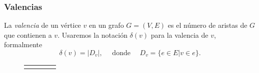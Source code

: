 \documentclass[handout]{beamer} %
\begin{document}
    \begin{frame}\frametitle{Valencias}
        La {\em {valencia}} de un vértice $v$ en un grafo $G=(V,E)$ es el
         número de aristas de $G$ que contienen a $v$.
        Usaremos la notación $\delta(v)$ para la valencia de $v$,
        formalmente
        $$
        \delta(v)=|D_v|, \quad \text{ donde } \quad D_v=\{e \in E| v\in
        e\}.
        $$
        
        \begin{ejemplo}
            \begin{figure}[ht]
                \begin{center}
                    \begin{tabular}{llll}
                        &\begin{tikzpicture}[scale=0.8]
                            \Vertex[x=0.00, y=2.00,L=$3$]{$a$}
                            \Vertex[x=1.90, y=0.62,L=$4$]{$b$}
                            \Vertex[x=1.18, y=-1.62,L=$1$]{$c$}
                            \Vertex[x=-1.18, y=-1.62,L=$3$]{$d$}
                            \Vertex[x=-1.90, y=0.62,L=$3$]{$e$}
                            \Edges($c$, $b$,$a$,$e$,$d$,$b$,$a$,$d$)
                            \Edges($e$,$b$)
                        \end{tikzpicture}
                        &
                        \qquad    \qquad
                        & 
                        \begin{tikzpicture}[scale=0.55]
                            \Vertex[x=3.00, y=0.00, L=$1$]{$v_3$}
                            \Vertex[x=1.50, y=2.60, L=$0$]{$v_2$}
                            \Vertex[x=-1.50, y=2.60, L=$2$]{$v_1$}
                            \Vertex[x=-3.00, y=0.00, L=$2$]{$v_6$}
                            \Vertex[x=-1.50, y=-2.60, L=$3$]{$v_5$}
                            \Vertex[x=1.50, y=-2.60, L=$2$]{$v_4$}
                            \Edges($v_1$,$v_6$, $v_5$,$v_4$,$v_1$)
                            \Edges($v_3$,$v_5$)
                        \end{tikzpicture}
                    \end{tabular}
                \end{center}
            \end{figure}
        \end{ejemplo}
    \end{frame}
    
\end{document}
